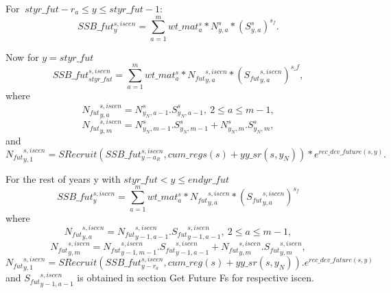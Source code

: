 \documentclass{article}
\begin{document}
For $\ styr\_fut-r_a\leq y \leq styr\_fut-1$:
\begin{equation}
    SSB\_fut^{s,iscen}_y=\sum_{a=1}^m wt\_{mat}^s_a* N^s_{y,a}*(S^s_{y,a})^{s_f}. 
\end{equation}


Now for $y=styr\_fut$ 
\begin{equation}
    SSB\_fut^{s,iscen}_{styr\_fut}= \sum_{a=1}^mwt\_{mat}^s_a*{N_{fut}}^{s,iscen}_{y,a}*({{S_{fut}}^{s,iscen}_{y,a}})^{s\_f},
\end{equation}
where 
\begin{equation}
    {N_{fut}}^{s,iscen}_{y,a}=N^s_{y_N,a-1}.S^s_{y_N,a-1}, \ 2\leq a \leq m-1,
\end{equation}
\begin{equation}
    {N_{fut}}^{s,iscen}_{y,m}=N^s_{y_N,m-1}.S^s_{y_N,m-1}+N^s_{y_N,m}.S^s_{y_N,m},
\end{equation}
and 
\begin{equation}
{N_{fut}}^{s,iscen}_{y,1}=SRecruit( SSB\_fut^{s,iscen}_{y-a_R},cum\_regs(s)+yy\_sr(s,y_N) ) * e^{rec\_dev\_future(s,y)}. 
\end{equation}


For the rest of years y with  $styr\_fut < y \leq endyr\_fut$
\begin{equation}
    SSB\_fut^{s,iscen}_y = \sum_{a=1}^m wt\_mat^s_{a}*{N_{fut}}^{s,iscen}_{y,a}*({S_{fut}}^{s,iscen}_{y,a})^{s_f}
\end{equation}
where
\begin{equation}
   {N_{fut}}^{s,iscen}_{y,a}={N_{fut}}^{s,iscen}_{y-1,a-1}.{S_{fut}}^{s,iscen}_{y-1,a-1},  \ 2\leq a \leq m-1,
\end{equation}
\begin{equation}
    {N_{fut}}^{s,iscen}_{y,m}={N_{fut}}^{s,iscen}_{y-1,m-1}.{S_{fut}}^{s,iscen}_{y-1,a-1} + {N_{fut}}^{s,iscen}_{y,m}.{S_{fut}}^{s,iscen}_{y,m},
\end{equation}
\begin{equation}
    {N_{fut}}^{s,iscen}_{y,1}=SRecruit(SSB\_fut^{s,iscen}_{y-r_a},cum\_reg(s)+yy\_sr(s,y_N)).e^{rec\_dev\_future(s,y)}
\end{equation}
and ${S_{fut}}^{s,iscen}_{y-1,a-1}$ is obtained in section Get Future Fs for respective iscen. \\
\end{document}
